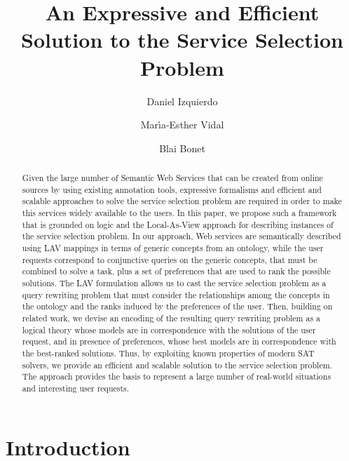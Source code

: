 \documentclass{llncs}
\begin{document}
\allowdisplaybreaks
\title{An Expressive and Efficient Solution to the Service Selection Problem}
\author{Daniel Izquierdo \and Mar\'{\i}a-Esther Vidal \and Blai Bonet}
\maketitle

\begin{abstract}
Given the large number of Semantic Web Services that can be created from
online sources by using existing annotation tools, expressive formalisms and
efficient and scalable approaches to solve the service selection problem are
required in order to make this services widely available to the users.
In this paper, we propose such a framework that is grounded on logic and
the Local-As-View approach for describing instances of the service selection problem.
In our approach, Web services are semantically described using LAV mappings
in terms of generic concepts from an ontology, while the user requests correspond
to conjunctive queries on the generic concepts, that must be combined to solve
a task, plus a set of preferences that are used to rank the possible solutions.
The LAV formulation allows us to cast the service selection problem as a
query rewriting problem that must consider the relationships among the concepts
in the ontology and the ranks induced by the preferences of the user.
Then, building on related work, we devise an encoding of the resulting
query rewriting problem as a logical theory whose models are in correspondence
with the solutions of the user request, and in presence of preferences, whose
best models are in correspondence with the best-ranked solutions.
Thus, by exploiting known properties of modern SAT solvers, we provide an
efficient and scalable solution to the service selection problem.
The approach provides the basis to represent a large number of real-world
situations and interesting user requests.
\end{abstract}                

\section{Introduction}
\end{document}
